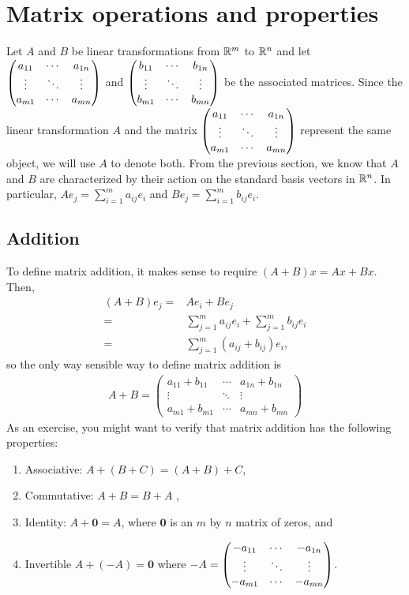 \section{Matrix operations and properties}

Let $A$ and $B$ be linear transformations from $\mathbb{R}^m$ to $\mathbb{R}^n$ and
let $\begin{pmatrix} {a}_{11} & \cdots & {a}_{1n} \\ \vdots & \ddots & \vdots \\ {a}_{m1} & \cdots & {a}_{mn} \end{pmatrix}$ and $\begin{pmatrix} {b}_{11} & \cdots & {b}_{1n} \\ \vdots & \ddots & \vdots \\ {b}_{m1} & \cdots & {b}_{mn} \end{pmatrix}$ be the associated matrices.  Since
the linear transformation $A$ and the matrix $\begin{pmatrix} {a}_{11} & \cdots & {a}_{1n} \\ \vdots & \ddots & \vdots \\ {a}_{m1} & \cdots & {a}_{mn} \end{pmatrix}$ represent
the same object, we will use $A$ to denote both.  From the previous
section, we know that $A$ and $B$ are characterized by their action on
the standard basis vectors in $\mathbb{R}^n$. In particular, $A e_j =
\sum_{i=1}^m a_{ij} e_i$ and $B e_j = \sum_{i=1}^m b_{ij} e_i$. 

\subsection{Addition} 
To define matrix addition, it makes sense to
require $(A+B)x = Ax + Bx$. Then,
\begin{align*}
  (A + B) e_j = & A e_i + B e_j \\
  = & \sum_{j=1}^m a_{ij} e_i + \sum_{j=1}^m b_{ij} e_i\\
  = & \sum_{j=1}^m (a_{ij} + b_{ij}) e_i,
\end{align*}
so the only way sensible way to define matrix addition is 
\begin{align*}
  A + B = \begin{pmatrix} a_{11} + b_{11} & \cdots &
    a_{1n} + b_{1n}  \\ \vdots & \ddots & \vdots \\ a_{m1} + b_{m1} & \cdots &
    a_{mn}+b_{mn} \end{pmatrix}
\end{align*}
As an exercise, you might want to verify that matrix addition has the
following properties:
\begin{enumerate}
\item Associative: $A+(B + C) = (A+B) + C$,
\item Commutative: $A + B = B + A$ ,
\item Identity: $A + \mathbf{0} = A$, where $\mathbf{0}$ is an $m$ by
  $n$ matrix of zeros, and
\item Invertible $A + (-A) = \mathbf{0}$ where $-A = \begin{pmatrix} {-a}_{11} & \cdots & {-a}_{1n} \\ \vdots & \ddots & \vdots \\ {-a}_{m1} & \cdots & {-a}_{mn} \end{pmatrix}$.
\end{enumerate}

